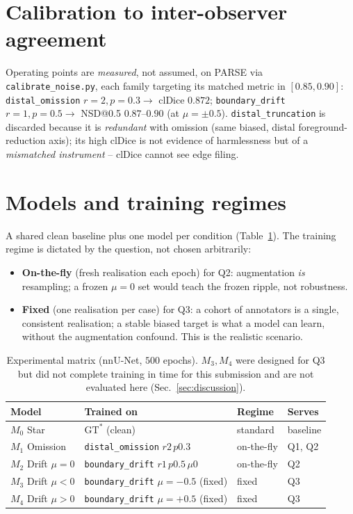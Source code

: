 \documentclass[
    bookmarks, bookmarksnumbered, bookmarksopen,
    colorlinks=true, citecolor=blue, linkcolor=blue, urlcolor=blue
]{techrep}
\newcommand{\gtstar}{\ensuremath{\mathrm{GT}^{\!*}}}
\begin{document}
\section{Calibration to inter-observer agreement}\label{sec:calib}
Operating points are \emph{measured}, not assumed, on PARSE via
\texttt{calibrate\_noise.py}, each family targeting its matched metric in $[0.85,0.90]$:
\texttt{distal\_omission} $r{=}2,p{=}0.3\to$ clDice $0.872$; \texttt{boundary\_drift}
$r{=}1,p{=}0.5\to$ NSD@0.5 $0.87$--$0.90$ (at $\mu{=}{\pm}0.5$). \texttt{distal\_truncation} is discarded
because it is \emph{redundant} with omission (same biased, distal foreground-reduction
axis); its high clDice is not evidence of harmlessness but of a \emph{mismatched
instrument} -- clDice cannot see edge filing.

\section{Models and training regimes}
A shared clean baseline plus one model per condition
(Table~\ref{tab:models}). The training regime is dictated by the question, not chosen
arbitrarily:
\begin{itemize}[leftmargin=1.4em,itemsep=2pt]
  \item \textbf{On-the-fly} (fresh realisation each epoch) for Q2: augmentation
  \emph{is} resampling; a frozen $\mu{=}0$ set would teach the frozen ripple, not
  robustness.
  \item \textbf{Fixed} (one realisation per case) for Q3: a cohort of annotators is a
  single, consistent realisation; a stable biased target is what a model can learn,
  without the augmentation confound. This is the realistic scenario.
\end{itemize}

\begin{table}[t]
  \centering
  \caption{Experimental matrix (nnU-Net, $500$ epochs). $M_3,M_4$ were designed for Q3
  but did not complete training in time for this submission and are not evaluated here
  (Sec.~\ref{sec:discussion}).}
  \label{tab:models}
  \small
  \begin{tabular}{llll}
    \toprule
    Model & Trained on & Regime & Serves \\
    \midrule
    $M_0$ Star          & $\gtstar$ (clean)                 & standard    & baseline \\
    $M_1$ Omission      & \texttt{distal\_omission} $r2\,p0.3$ & on-the-fly & Q1, Q2 \\
    $M_2$ Drift $\mu{=}0$  & \texttt{boundary\_drift} $r1\,p0.5\,\mu0$ & on-the-fly & Q2 \\
    $M_3$ Drift $\mu{<}0$  & \texttt{boundary\_drift} $\mu{=}{-}0.5$ (fixed) & fixed & Q3 \\
    $M_4$ Drift $\mu{>}0$  & \texttt{boundary\_drift} $\mu{=}{+}0.5$ (fixed) & fixed & Q3 \\
    \bottomrule
  \end{tabular}
\end{table}
\end{document}
